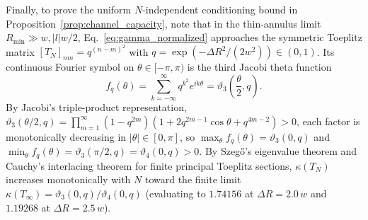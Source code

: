 \documentclass[aps,pra,onecolumn,notitlepage,11pt,tightenlines,nofootinbib,floatfix,longbibliography]{revtex4-2}
\theoremstyle{remark}
\newcommand{\abs}[1]{\lvert #1 \rvert}
\begin{document}
Finally, to prove the uniform $N$-independent conditioning bound in Proposition~\ref{prop:channel_capacity}, note that in the thin-annulus limit $R_{\min} \gg w, \abs{l}w/2$, Eq.~\eqref{eq:gamma_normalized} approaches the symmetric Toeplitz matrix $[T_N]_{nm} = q^{(n-m)^2}$ with $q = \exp(-\Delta R^2/(2w^2)) \in (0,1)$. Its continuous Fourier symbol on $\theta \in [-\pi,\pi)$ is the third Jacobi theta function
\begin{equation}
f_q(\theta) = \sum_{k=-\infty}^\infty q^{k^2} e^{ik\theta} = \vartheta_3\!\left(\frac{\theta}{2}, q\right).
\label{eq:app_jacobi_symbol}
\end{equation}
By Jacobi's triple-product representation, $\vartheta_3(\theta/2, q) = \prod_{m=1}^\infty (1 - q^{2m})(1 + 2q^{2m-1}\cos\theta + q^{4m-2}) > 0$, each factor is monotonically decreasing in $\abs{\theta} \in [0,\pi]$, so $\max_\theta f_q(\theta) = \vartheta_3(0,q)$ and $\min_\theta f_q(\theta) = \vartheta_3(\pi/2,q) = \vartheta_4(0,q) > 0$. By Szeg\H{o}'s eigenvalue theorem and Cauchy's interlacing theorem for finite principal Toeplitz sections, $\kappa(T_N)$ increases monotonically with $N$ toward the finite limit $\kappa(T_\infty) = \vartheta_3(0,q)/\vartheta_4(0,q)$ (evaluating to $1.74156$ at $\Delta R = 2.0\,w$ and $1.19268$ at $\Delta R = 2.5\,w$).


\end{document}
